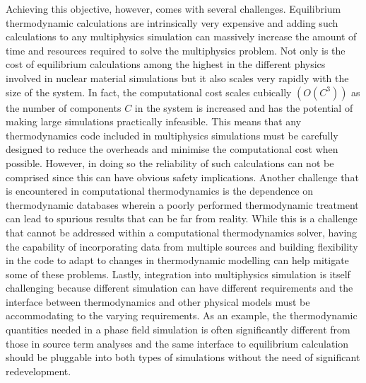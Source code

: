 	Achieving this objective, however, comes with several challenges. Equilibrium thermodynamic calculations are intrinsically very expensive and adding such calculations to any multiphysics simulation can massively increase the amount of time and resources required to solve the multiphysics problem. Not only is the cost of equilibrium calculations among the highest in the different physics involved in nuclear material simulations but it also scales very rapidly with the size of the system. In fact, the computational cost scales cubically $\left(\mathit{O}(C^3)\right)$ as the number of components $C$ in the system is increased and has the potential of making large simulations practically infeasible. This means that any thermodynamics code included in multiphysics simulations must be carefully designed to reduce the overheads and minimise the computational cost when possible. However, in doing so the reliability of such calculations can not be comprised since this can have obvious safety implications. Another challenge that is encountered in computational thermodynamics is the dependence on thermodynamic databases wherein a poorly performed thermodynamic treatment can lead to spurious results that can be far from reality. While this is a challenge that cannot be addressed within a computational thermodynamics solver, having the capability of incorporating data from multiple sources and building flexibility in the code to adapt to changes in thermodynamic modelling can help mitigate some of these problems. Lastly, integration into multiphysics simulation is itself challenging because different simulation can have different requirements and the interface between thermodynamics and other physical models must be accommodating to the varying requirements. As an example, the thermodynamic quantities needed in a phase field simulation is often significantly different from those in source term analyses and the same interface to equilibrium calculation should be pluggable into both types of simulations without the need of significant redevelopment.
	
